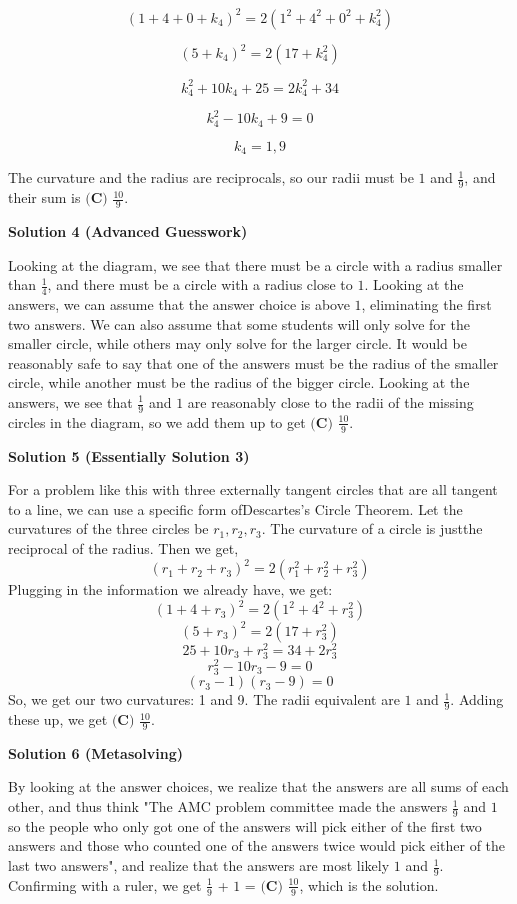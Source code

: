 \begin{enumerate}
 
 \[(1+4+0+k_4)^2=2(1^2+4^2+0^2+k_4^2)\]

 \[(5+k_4)^2=2(17+k_4^2)\]

 \[k_4^2+10k_4+25=2k_4^2+34\]

 \[k_4^2-10k_4+9=0\]

 \[k_4=1,9\]

 The curvature and the radius are reciprocals, so our radii must be $1$ and $\frac{1}{9}$, and their sum is $\boxed{\textbf{(C) }\frac{10}{9}}$.

 



\textbf{Solution 4 (Advanced Guesswork)}

Looking at the diagram, we see that there must be a circle with a radius smaller than $\frac14$, and there must be a circle with a radius close to $1$. Looking at the answers, we can assume that the answer choice is above $1$, eliminating the first two answers. We can also assume that some students will only solve for the smaller circle, while others may only solve for the larger circle. It would be reasonably safe to say that one of the answers must be the radius of the smaller circle, while another must be the radius of the bigger circle. Looking at the answers, we see that  $\frac19$ and $1$ are reasonably close to the radii of the missing circles in the diagram, so we add them up to get $\boxed{\textbf{(C) }\frac{10}{9}}$.

 



\textbf{Solution 5 (Essentially Solution 3)}

For a problem like this with three externally tangent circles that are all tangent to a line, we can use a specific form ofDescartes's Circle Theorem. Let the curvatures of the three circles be $r_1, r_2, r_3$. The curvature of a circle is justthe reciprocal of the radius. Then we get, 
 \[(r_1 + r_2 + r_3)^2 = 2(r_1^2 + r_2^2 + r_3^2)\] Plugging in the information we already have, we get:
 \[(1 + 4 + r_3)^2 = 2(1^2 + 4^2 + r_3^2)\]
 \[(5 + r_3)^2 = 2(17 + r_3^2)\]
 \[25 + 10r_3 + r_3^2 = 34 + 2r_3^2\]
 \[r_3^2 - 10r_3 - 9 = 0\]
 \[(r_3 - 1)(r_3 - 9) = 0\]So, we get our two curvatures: 1 and 9. The radii equivalent are $1$ and $\frac{1}{9}$. Adding these up, we get $\boxed{\textbf{(C) }\frac{10}{9}}$.

 



\textbf{Solution 6 (Metasolving)}

By looking at the answer choices, we realize that the answers are all sums of each other, and thus think "The AMC problem committee made the answers $\frac{1}{9}$ and $1$ so the people who only got one of the answers will pick either of the first two answers and those who counted one of the answers twice would pick either of the last two answers", and realize that the answers are most likely $1$ and $\frac{1}{9}$. Confirming with a ruler, we get $\frac{1}{9}$ + $1$ = $\boxed{\textbf{(C) }\frac{10}{9}}$, which is the solution. 


\end{enumerate}

